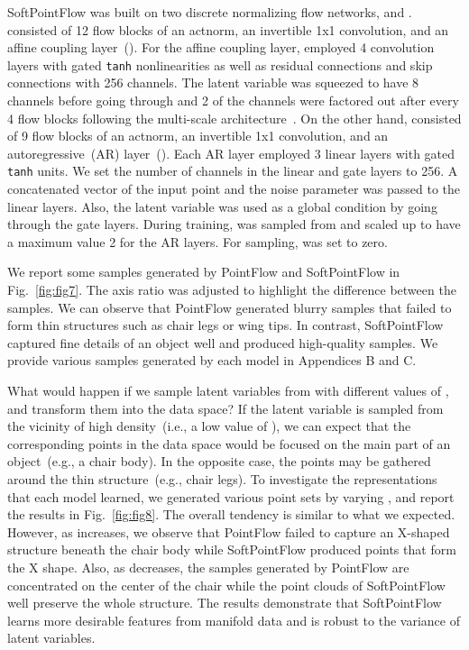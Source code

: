 \documentclass{article}
\begin{document}
SoftPointFlow was built on two discrete normalizing flow networks,  and .  consisted of 12 flow blocks of an actnorm, an invertible 1x1 convolution, and an affine coupling layer~(). For the affine coupling layer,  employed 4 convolution layers with gated \texttt{tanh} nonlinearities as well as residual connections and skip connections with 256 channels. The latent variable  was squeezed to have 8 channels before going through  and 2 of the channels were factored out after every 4 flow blocks following the multi-scale architecture~\citep{dinh2016density}. On the other hand,  consisted of 9 flow blocks of an actnorm, an invertible 1x1 convolution, and an autoregressive~(AR) layer~(). Each AR layer employed 3 linear layers with gated \texttt{tanh} units. We set the number of channels in the linear and gate layers to 256. A concatenated vector of the input point and the noise parameter was passed to the linear layers. Also, the latent variable  was used as a global condition by going through the gate layers. During training,  was sampled from  and scaled up to have a maximum value 2 for the AR layers. For sampling,  was set to zero.

We report some samples generated by PointFlow and SoftPointFlow in Fig.~\ref{fig:fig7}. The axis ratio was adjusted to highlight the difference between the samples. We can observe that PointFlow generated blurry samples that failed to form thin structures such as chair legs or wing tips. In contrast, SoftPointFlow captured fine details of an object well and produced high-quality samples. We provide various samples generated by each model in Appendices B and C. 

What would happen if we sample latent variables from  with different values of , and transform them into the data space? If the latent variable is sampled from the vicinity of high density~(i.e., a low value of ), we can expect that the corresponding points in the data space would be focused on the main part of an object~(e.g., a chair body). In the opposite case, the points may be gathered around the thin structure~(e.g., chair legs). To investigate the representations that each model learned, we generated various point sets by varying , and report the results in Fig.~\ref{fig:fig8}. The overall tendency is similar to what we expected. However, as  increases, we observe that PointFlow failed to capture an X-shaped structure beneath the chair body while SoftPointFlow produced points that form the X shape. Also, as  decreases, the samples generated by PointFlow are concentrated on the center of the chair while the point clouds of SoftPointFlow well preserve the whole structure. The results demonstrate that SoftPointFlow learns more desirable features from manifold data and is robust to the variance of latent variables.
\end{document}
